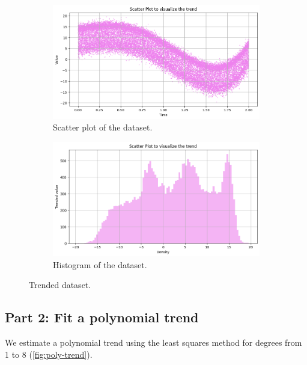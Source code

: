\documentclass[a4paper]{article}
\begin{document}
\begin{figure}[htbp]
  \centering
  \begin{subfigure}[b]{0.48\textwidth}
    \centering
    \includegraphics[width=\textwidth]{images/trended_scatter.png}
    \caption{Scatter plot of the dataset.}\label{fig:trend-scatter}
  \end{subfigure}
  \hfill
  \begin{subfigure}[b]{0.48\textwidth}
    \centering
    \includegraphics[width=\textwidth]{images/trended_dist.png}
    \caption{Histogram of the dataset.}\label{fig:trend-hist}
  \end{subfigure}
  \caption{Trended dataset.}\label{fig:trend}
\end{figure}

\subsection*{Part 2: Fit a polynomial trend}

We estimate a polynomial trend using the least squares method for degrees from 1 to 8 (\ref{fig:poly-trend}).
\end{document}
